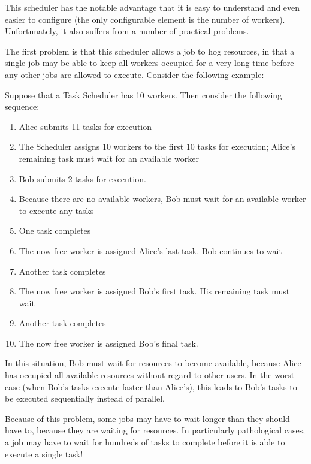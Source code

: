This scheduler has the notable advantage that it is easy to understand and even easier to configure (the only configurable element is the number of workers). Unfortunately, it also suffers from a number of practical problems. 

The first problem is that this scheduler allows a job to hog resources, in that a single job may be able to keep all workers occupied for a very long time before any other jobs are allowed to execute. Consider the following example:

\begin{exmp}
Suppose that a Task Scheduler has 10 workers. Then consider the following sequence:

\begin{enumerate}
\item Alice submits 11 tasks for execution
\item The Scheduler assigns 10 workers to the first 10 tasks for execution; Alice's remaining task must wait for an available worker
\item Bob submits 2 tasks for execution. 
\item Because there are no available workers, Bob must wait for an available worker to execute any tasks
\item One task completes
\item The now free worker is assigned Alice's last task. Bob continues to wait
\item Another task completes
\item The now free worker is assigned Bob's first task. His remaining task must wait
\item Another task completes
\item The now free worker is assigned Bob's final task.
\end{enumerate}

In this situation, Bob must wait for resources to become available, because Alice has occupied all available resources without regard to other users. In the worst case (when Bob's tasks execute faster than Alice's), this leads to Bob's tasks to be executed sequentially instead of parallel.
\end{exmp}

Because of this problem, some jobs may have to wait longer than they should have to, because they are waiting for resources. In particularly pathological cases, a job may have to wait for hundreds of tasks to complete before it is able to execute a single task!


